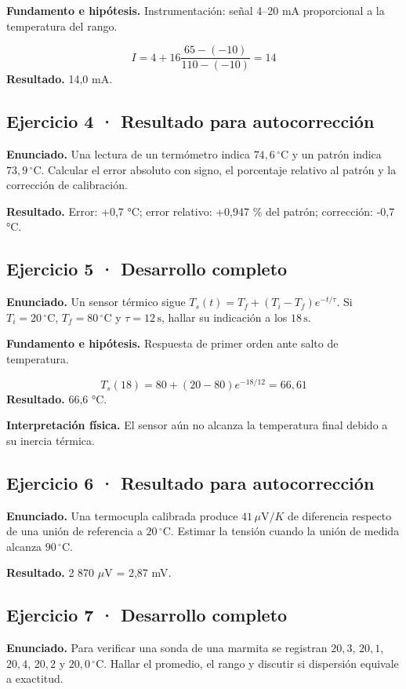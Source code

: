 \documentclass[11pt,a4paper]{article}
\begin{document}
\textbf{Fundamento e hipótesis.} Instrumentación: señal 4–20 mA proporcional a la temperatura del rango.

\[
I=4+16\frac{65-(-10)}{110-(-10)}=14
\]
\textbf{Resultado.} 14,0 mA.


\subsection*{Ejercicio 4 · Resultado para autocorrección}
\textbf{Enunciado.} Una lectura de un termómetro indica \(74{,}6\,^\circ\mathrm C\) y un patrón indica \(73{,}9\,^\circ\mathrm C\). Calcular el error absoluto con signo, el porcentaje relativo al patrón y la corrección de calibración.

\textbf{Resultado.} Error: +0,7 °C; error relativo: +0,947 \% del patrón; corrección: -0,7 °C.


\subsection*{Ejercicio 5 · Desarrollo completo}
\textbf{Enunciado.} Un sensor térmico sigue \(T_s(t)=T_f+(T_i-T_f)e^{-t/\tau}\). Si \(T_i=20\,^\circ\mathrm C\), \(T_f=80\,^\circ\mathrm C\) y \(\tau=12\,\mathrm s\), hallar su indicación a los \(18\,\mathrm s\).

\textbf{Fundamento e hipótesis.} Respuesta de primer orden ante salto de temperatura.

\[
T_s(18)=80+(20-80)e^{-18/12}=66{,}61
\]
\textbf{Resultado.} 66,6 °C.

\textbf{Interpretación física.} El sensor aún no alcanza la temperatura final debido a su inercia térmica.


\subsection*{Ejercicio 6 · Resultado para autocorrección}
\textbf{Enunciado.} Una termocupla calibrada produce \(41\,\mu\mathrm V/K\) de diferencia respecto de una unión de referencia a \(20\,^\circ\mathrm C\). Estimar la tensión cuando la unión de medida alcanza \(90\,^\circ\mathrm C\).

\textbf{Resultado.} 2 870 \ensuremath{\mu}V = 2,87 mV.


\subsection*{Ejercicio 7 · Desarrollo completo}
\textbf{Enunciado.} Para verificar una sonda de una marmita se registran \(20{,}3\), \(20{,}1\), \(20{,}4\), \(20{,}2\) y \(20{,}0\,^\circ\mathrm C\). Hallar el promedio, el rango y discutir si dispersión equivale a exactitud.
\end{document}
